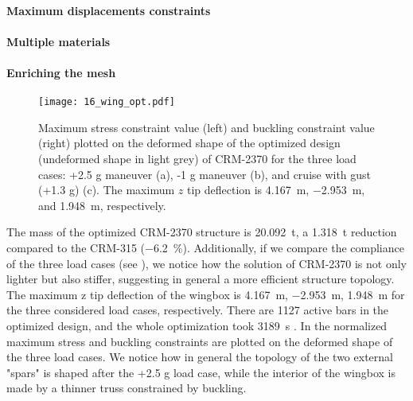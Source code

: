 \paragraph{Maximum displacements constraints}

\paragraph{Multiple materials}

\paragraph{Enriching the mesh}
\begin{figure*}
    \centering
    \texttt{[image: 16\_wing\_opt.pdf]}
     \caption{Maximum stress constraint value (left) and buckling constraint value (right) plotted on the deformed shape of the optimized design (undeformed shape in light grey) of CRM-2370 for the three load cases: +2.5 g maneuver (a), -1 g maneuver (b), and cruise with gust (+1.3 g) (c). The maximum $z$ tip deflection is \qty{4.167}{m}, \qty{-2.953}{m}, and \qty{1.948}{m}, respectively.}
    \label{fig:wing_opt}
\end{figure*}
The mass of the optimized CRM-2370 structure is \qty{20.092}{\tonne}, a \qty{1.318}{\tonne} reduction compared to the CRM-315 (\qty{-6.2}{\%}). Additionally, if we compare the compliance of the three load cases (see ), we notice how the solution of CRM-2370 is not only lighter but also stiffer, suggesting in general a more efficient structure topology. The maximum z tip deflection of the wingbox is \qty{4.167}{m}, \qty{-2.953}{m}, \qty{1.948}{m} for the three considered load cases, respectively. There are 1127 active bars in the optimized design, and the whole optimization took \qty{3189}{s} .  In  the normalized maximum stress and buckling constraints are plotted on the deformed shape of the three load cases. We notice how in general the topology of the two external "spars" is shaped after the +2.5 g load case, while the interior of the wingbox is made by a thinner truss constrained by buckling. 

